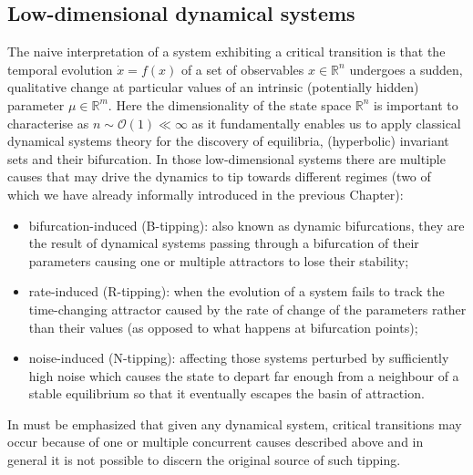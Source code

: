 \documentclass[../main.tex]{subfiles}
\begin{document}
\subsection{Low-dimensional dynamical systems}\label{subsec3.1}
The naive interpretation of a system exhibiting a critical transition is that the temporal evolution $\dot{x}=f(x)$ of a set of observables $x\in \mathbb{R}^{n}$ undergoes a sudden, qualitative change at particular values of an intrinsic (potentially hidden) parameter $\mu\in \mathbb{R}^{m}$. 
Here the dimensionality of the state space $\mathbb{R}^{n}$ is important to characterise as $n \sim \mathcal{O}(1)\ll\infty$ as it fundamentally enables us to apply classical dynamical systems theory for the discovery of equilibria, (hyperbolic) invariant sets and their bifurcation.
In those low-dimensional systems there are multiple causes that may drive the dynamics to tip towards different regimes (two of which we have already informally introduced in the previous Chapter):
\begin{itemize}
     \item bifurcation-induced (B-tipping): also known as dynamic bifurcations, they are the result of dynamical systems passing through a bifurcation of their parameters causing one or multiple attractors to lose their stability;
     \item rate-induced (R-tipping): when the evolution of a system fails to track the time-changing attractor caused by the rate of change of the parameters rather than their values (as opposed to what happens at bifurcation points);
     \item noise-induced (N-tipping): affecting those systems perturbed by sufficiently high noise which causes the state to depart far enough from a neighbour of a stable equilibrium so that it eventually escapes the basin of attraction.
\end{itemize}
In must be emphasized that given any dynamical system, critical transitions may occur because of one or multiple concurrent causes described above and in general it is not possible to discern the original source of such tipping.
\end{document}
